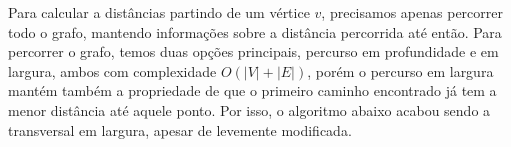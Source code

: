 \par Para calcular a distâncias partindo de um vértice $v$, precisamos apenas percorrer todo o grafo, mantendo informações sobre a distância percorrida
até então. Para percorrer o grafo, temos duas opções principais, percurso em profundidade e em largura, ambos com complexidade
$O\left(|V| + |E|\right)$, porém o percurso em largura mantém também a propriedade de que o primeiro caminho encontrado já tem
a menor distância até aquele ponto. Por isso, o algoritmo abaixo acabou sendo a transversal em largura, apesar de levemente modificada.